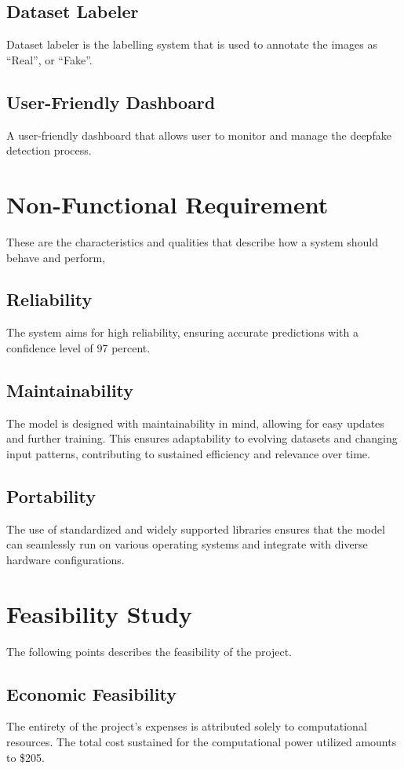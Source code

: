     \subsection{Dataset Labeler}
        Dataset labeler is the labelling system that is used to annotate the images as “Real”, or “Fake”.

    \subsection{User-Friendly Dashboard}
        A user-friendly dashboard that allows user to monitor and manage the deepfake detection process.

\section{Non-Functional Requirement}
    These are the characteristics and qualities that describe how a system should behave and perform,

    \subsection{Reliability}
        The system aims for high reliability, ensuring accurate predictions with a confidence level of 97 percent.
    \subsection{Maintainability}
        The model is designed with maintainability in mind, allowing for easy updates and further training. This ensures adaptability to evolving datasets and changing input patterns, contributing to sustained efficiency and relevance over time.
    \subsection{Portability}
        The use of standardized and widely supported libraries ensures that the model can seamlessly run on various operating systems and integrate with diverse hardware configurations.
    
\section{Feasibility Study}
    The following points describes the feasibility of the project.

    \subsection{Economic Feasibility}
        The entirety of the project's expenses is attributed solely to computational resources. The total cost sustained for the computational power utilized amounts to \$205.

